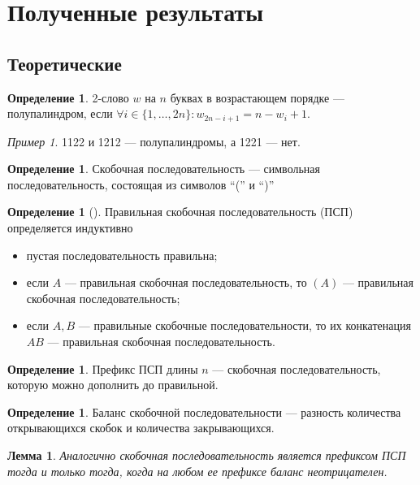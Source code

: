 \documentclass[a4paper,fleqn,12pt,top=0pt]{article}
\theoremstyle{plain}
\newtheorem{lemma}[theorem]{Лемма}
\theoremstyle{definition}
\newtheorem{definition}[theorem]{Определение}
\theoremstyle{remark}
\newtheorem{example}[theorem]{Пример}
\begin{document}
\newpage
\section{Полученные результаты}
\subsection{Теоретические}

\begin{definition}
    2-слово $w$ на $n$ буквах в возрастающем порядке --- полупалиндром, если $\forall i \in \{1, \dots, 2n\}:  w_{2n - i + 1} = n - w_i + 1$.
\end{definition}

\begin{example}
    1122 и 1212 --- полупалиндромы, а 1221 --- нет.
\end{example}

\begin{definition}
    Скобочная последовательность --- символьная последовательность, состоящая из символов ``('' и ``)''
\end{definition}

\begin{definition}[]
    Правильная скобочная последовательность (ПСП) определяется индуктивно
    \begin{itemize}
        \item пустая последовательность правильна;
        \item если $A$ --- правильная скобочная последовательность, то $(A)$ --- правильная скобочная последовательность;
        \item если $A, B$ --- правильные скобочные последовательности, то их конкатенация $AB$ --- правильная скобочная последовательность.
    \end{itemize}
\end{definition}

\begin{definition}
    Префикс ПСП длины $n$ --- скобочная последовательность, которую можно дополнить до правильной.
\end{definition}

\begin{definition}
    Баланс скобочной последовательности --- разность количества открывающихся скобок и количества закрывающихся.
\end{definition}

\begin{lemma}
    Аналогично \cite[Теорема 2.2.]{hse} скобочная последовательность является префиксом ПСП тогда и только тогда, когда на любом ее префиксе баланс неотрицателен.
\end{lemma}
\end{document}
